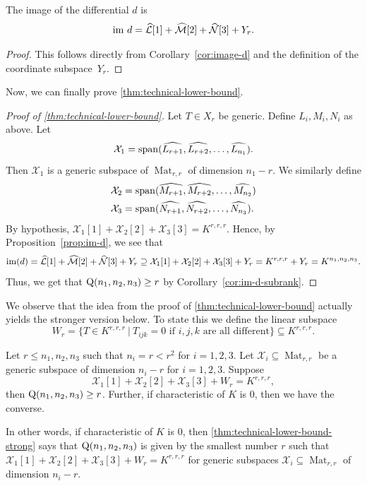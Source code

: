 \documentclass[10pt,a4paper]{article}
\theoremstyle{definition}
\theoremstyle{remark}
\newcommand{\gensubrank}{{\rm Q}}
\newcommand{\spa}{{\rm span}}
\newcommand{\Mat}{\operatorname{Mat}}
\newcommand{\im}{{\rm im}}
\begin{document}
%


\begin{proposition} \label{prop:im-d}
The image of the differential $d$ is
$$
\im\ d = \mathcal{\widehat{L}}[1] + \mathcal{\widehat{M}}[2] + \mathcal{\widehat{N}}[3] + Y_r.
$$
\end{proposition}

\begin{proof}
This follows directly from Corollary~\ref{cor:image-d} and the definition of the coordinate subspace~$Y_r$.
\end{proof}


Now, we can finally prove \autoref{thm:technical-lower-bound}.

\begin{proof} [Proof of \autoref{thm:technical-lower-bound}]
Let $T \in X_r$ be generic. Define $L_i, M_i, N_i$ as above. Let
\[
\mathcal{X}_1 = \spa (\widehat{L_{r+1}}, \widehat{L_{r+2}}, \dots, \widehat{L_{n_1}}).
\]
Then $\mathcal{X}_1$ is a generic subspace of $\Mat_{r,r}$ of dimension $n_1 - r$. We similarly define 
\begin{align*}
\mathcal{X}_2 &= \spa (\widehat{M_{r+1}}, \widehat{M_{r+2}}, \dots, \widehat{M_{n_2}})\\
\mathcal{X}_3 &= \spa (\widehat{N_{r+1}}, \widehat{N_{r+2}}, \dots, \widehat{N_{n_3}}).
\end{align*}
By hypothesis, $\mathcal{X}_1[1] + \mathcal{X}_2[2] + \mathcal{X}_3[3] = K^{r,r,r}$. Hence, by Proposition~\ref{prop:im-d}, we see that 
\[
\im(d) = \mathcal{\widehat{L}}[1] + \mathcal{\widehat{M}}[2] + \mathcal{\widehat{N}}[3] + Y_r \supseteq \mathcal{X}_1[1] + \mathcal{X}_2[2] + \mathcal{X}_3[3] + Y_r = K^{r,r,r} + Y_r = K^{n_1,n_2,n_3}.
\]
Thus, we get that $\gensubrank(n_1,n_2,n_3) \geq r$  by Corollary~\ref{cor:im-d-subrank}.
\end{proof}

%
%

%

%

We observe that the idea from the proof of \autoref{thm:technical-lower-bound} actually yields the stronger version below. To state this we define the linear subspace
\[
W_r =  \{T \in K^{r,r,r} \ | \ T_{ijk} = 0 \text{ if  $i,j,k$ are all different} \} \subseteq K^{r,r,r}.
\]\par
\begin{theorem}\label{thm:technical-lower-bound-strong}
Let $r \leq n_1,n_2,n_3$ such that $n_i = r < r^2$ for $i = 1,2,3$. Let $\mathcal{X}_i \subseteq \Mat_{r,r}$ be a generic subspace of dimension $n_i - r$ for $i = 1,2,3$. Suppose 
$$
\mathcal{X}_1[1] + \mathcal{X}_2[2] + \mathcal{X}_3[3] + W_r = K^{r,r,r},
$$
then $\gensubrank(n_1,n_2,n_3) \geq r$.
Further, if characteristic of $K$ is $0$, then we have the converse.
\end{theorem}
In other words, if characteristic of $K$ is $0$, then \autoref{thm:technical-lower-bound-strong} says that $\gensubrank(n_1,n_2,n_3)$ is given by the smallest number $r$ such that 
%
%
$\mathcal{X}_1[1] + \mathcal{X}_2[2] + \mathcal{X}_3[3] + W_r = K^{r,r,r}$ for generic subspaces $\mathcal{X}_i \subseteq \Mat_{r,r}$ of dimension $n_i -r$.
%
%
\end{document}

